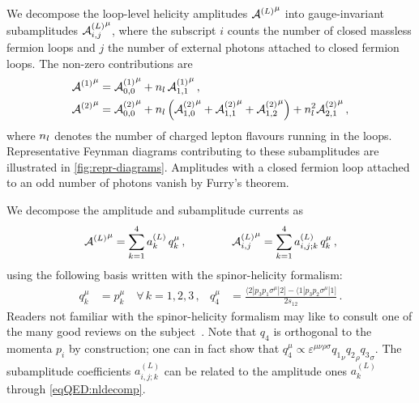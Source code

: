 \documentclass[main.tex]{subfiles}
\begin{document}
We decompose the loop-level helicity amplitudes ${\mathcal{A}^{(L)}}^{\mu}$ into gauge-invariant
subamplitudes ${\mathcal{A}^{(L)}_{i, j}}^{\mu}$, where the subscript $i$ counts the number of
closed massless fermion loops and $j$ the number of external photons attached
to closed fermion loops. The non-zero contributions are
\begin{subequations}
    \label{eqQED:nldecomp}
    \begin{align}
        {\mathcal{A}^{(1)}}^{\mu} &= {\mathcal{A}^{(1)}_{0, 0}}^{\mu} + n_l \, {\mathcal{A}^{(1)}_{1, 1}}^{\mu} \,, \\
        {\mathcal{A}^{(2)}}^{\mu} &= {\mathcal{A}^{(2)}_{0, 0}}^{\mu}
        + n_l \left( {\mathcal{A}^{(2)}_{1, 0}}^{\mu} + {\mathcal{A}^{(2)}_{1, 1}}^{\mu} + {\mathcal{A}^{(2)}_{1, 2}}^{\mu} \right)
        + n_l^2 {\mathcal{A}^{(2)}_{2, 1}}^{\mu} \,,
    \end{align}
\end{subequations}
where $n_l$ denotes the number of charged lepton flavours running in the loops.
Representative Feynman diagrams contributing to these subamplitudes are illustrated in \cref{fig:repr-diagrams}.
Amplitudes with a closed fermion loop attached to an odd number of photons vanish by Furry's theorem.

We decompose the amplitude and subamplitude currents as
\begin{align}
    \label{eqQED:offshellproj}
    {\mathcal{A}^{(L)}}^{\mu} = \sum_{k=1}^4 a_{k}^{(L)} \, q_k^\mu \,, \qquad \qquad {\mathcal{A}^{(L)}_{i, j}}^{\mu} = \sum_{k=1}^4 a_{i,j;k}^{(L)} \, q_k^\mu \,,
\end{align}
using the following basis written with the spinor-helicity formalism:
\begin{align}
    \label{eqQED:proj-basis}
    q_k^\mu &= p_k^\mu \quad\forall \, k=1,2,3 \,, &
    q_4^\mu &= \frac{\langle 2|p_3p_1\sigma^\mu|2 ] - \langle 1|p_3p_2\sigma^\mu|1 ]}{2 s_{12}} \,.
\end{align}
Readers not familiar with the spinor-helicity formalism may like to consult one of the many good reviews on the subject~\cite{Mangano:1990by,Dixon:1996wi,Badger:2023eqz}.
Note that $q_4$ is orthogonal to the momenta $p_i$ by construction; one can in fact show that $q_4^\mu\propto \varepsilon^{\mu\nu\rho\sigma}{q_1}_\nu{q_2}_\rho{q_3}_\sigma$. 
The subamplitude coefficients $a_{i,j;k}^{(L)}$ can be related to the amplitude ones $a_{k}^{(L)}$ through \cref{eqQED:nldecomp}.

\smallskip
\end{document}
